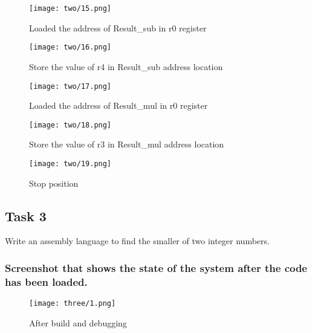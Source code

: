\documentclass[a4paper,12pt]{article}
\begin{document}
\begin{figure}[H]
    \centering
    \texttt{[image: two/15.png]}
    \caption{Loaded the address of Result\_sub in r0 register}
\end{figure}
\begin{figure}[H]
    \centering
    \texttt{[image: two/16.png]}
    \caption{Store the value of r4 in Result\_sub address location}
\end{figure}
\begin{figure}[H]
    \centering
    \texttt{[image: two/17.png]}
    \caption{Loaded the address of Result\_mul in r0 register}
\end{figure}
\begin{figure}[H]
    \centering
    \texttt{[image: two/18.png]}
    \caption{Store the value of r3 in Result\_mul address location}
\end{figure}
\begin{figure}[H]
    \centering
    \texttt{[image: two/19.png]}
    \caption{Stop position}
\end{figure}
\subsection{Task 3}
Write an assembly language to find the smaller of two integer numbers.
\subsubsection{Screenshot that shows the state of the system after the code has been loaded.}
\begin{figure}[H]
    \centering
    \texttt{[image: three/1.png]}
    \caption{After build and debugging}
\end{figure}
\end{document}
